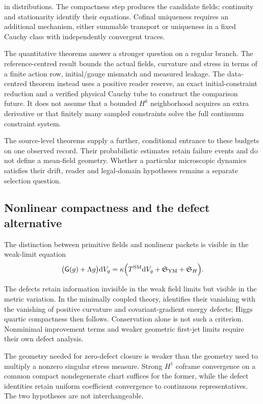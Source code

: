 \documentclass[11pt]{article}
\numberwithin{equation}{section}
\theoremstyle{definition}
\theoremstyle{remark}
\newcommand{\dd}{\mathrm d}
\newcommand{\Eins}{\mathsf G}
\newcommand{\dV}{\dd V}
\begin{document}
in distributions. The compactness step produces the candidate fields;
continuity and stationarity identify their equations. Cofinal uniqueness
requires an additional mechanism, either summable transport or uniqueness
in a fixed Cauchy class with independently convergent traces.

The quantitative theorems answer a stronger question on a regular branch.
The reference-centred result bounds the actual fields, curvature and stress
in terms of a finite action row, initial/gauge mismatch and measured leakage.
The data-centred theorem instead uses a positive reader reserve, an exact
initial-constraint reduction and a verified physical Cauchy tube to construct
the comparison future. It does not assume that a bounded $H^k$ neighborhood
acquires an extra derivative or that finitely many sampled constraints solve
the full continuum constraint system.

The source-level theorems supply a further, conditional entrance to these
budgets on one observed record. Their probabilistic estimates retain failure
events and do not define a mean-field geometry. Whether a particular
microscopic dynamics satisfies their drift, reader and legal-domain
hypotheses remains a separate selection question.

\subsection{Nonlinear compactness and the defect alternative}

The distinction between primitive fields and nonlinear packets is visible
in the weak-limit equation
\begin{equation}
\bigl(\Eins(g)+\Lambda g\bigr)\dV_g
=
\kappa\Bigl(
T^{\mathrm{SM}}\dV_g
+\mathfrak S_{\mathrm{YM}}
+\mathfrak S_H
\Bigr).
\label{eq:discussion-defect}
\end{equation}

The defects retain information invisible in the weak field limits but
visible in the metric variation. In the minimally coupled theory,
 identifies their vanishing with the
vanishing of positive curvature and covariant-gradient energy defects;
Higgs quartic compactness then follows. Conservation alone is not such a
criterion. Nonminimal improvement terms and weaker geometric first-jet
limits require their own defect analysis.

The geometry needed for zero-defect closure is weaker than the geometry
used to multiply a nonzero singular stress measure. Strong $H^1$ coframe
convergence on a common compact nondegenerate chart suffices for the former,
while the defect identities retain uniform coefficient convergence to
continuous representatives. The two hypotheses are not interchangeable.
\end{document}
